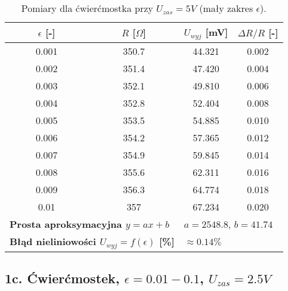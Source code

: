 \documentclass[12pt, a4paper]{article}
\begin{document}
	\begin{table}[H]
		\centering
		\caption{Pomiary dla ćwierćmostka przy $U_{zas} = 5 V$ (mały zakres $\epsilon$).}
		\begin{tabular}{cccc}
			\toprule
			$\epsilon$ [-] & $R$ [$\Omega$] & $U_{wyj}$ [mV] & $\Delta R/R$ [-] \\
			\midrule
			0.001 & 350.7 & 44.321 & 0.002 \\
			0.002 & 351.4 & 47.420 & 0.004 \\
			0.003 & 352.1 & 49.810 & 0.006 \\
			0.004 & 352.8 & 52.404 & 0.008 \\
			0.005 & 353.5 & 54.885 & 0.010 \\
			0.006 & 354.2 & 57.365 & 0.012 \\
			0.007 & 354.9 & 59.845 & 0.014 \\
			0.008 & 355.6 & 62.311 & 0.016 \\
			0.009 & 356.3 & 64.774 & 0.018 \\
			0.01 & 357 & 67.234 & 0.020 \\
			\midrule
			\multicolumn{2}{l}{\textbf{Prosta aproksymacyjna $y = ax + b$}} & \multicolumn{2}{l}{$a = 2548.8$, $b = 41.74$} \\
			\multicolumn{2}{l}{\textbf{Błąd nieliniowości $U_{wyj} = f(\epsilon)$ [\%]}} & \multicolumn{2}{l}{$\approx 0.14 \%$} \\
			\bottomrule
		\end{tabular}
	\end{table}
	
	\subsection{1c. Ćwierćmostek, $\epsilon = 0.01-0.1$, $U_{zas} = 2.5 V$}
	
\end{document}

